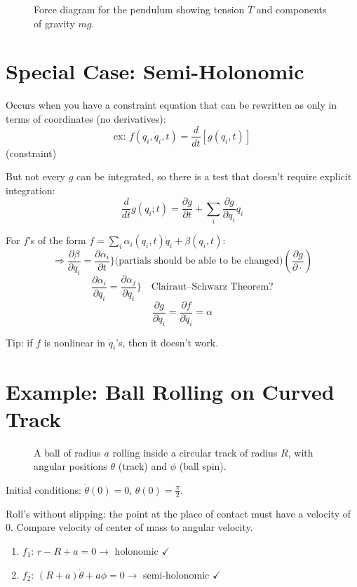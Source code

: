 \begin{figure}[H]
    \centering
    \caption{Force diagram for the pendulum showing tension $T$ and components of gravity $mg$.}
\end{figure}

\section{Special Case: Semi-Holonomic}

Occurs when you have a constraint equation that can be rewritten as only in terms of coordinates (no derivatives):
\[
    \text{ex: } f(q_i, \dot{q}_i, t) = \frac{d}{dt}\!\left[g(q_i, t)\right]
\]
(constraint)

But not every $g$ can be integrated, so there is a test that doesn't require explicit integration:
\[
    \frac{d}{dt}g(q_i; t) = \frac{\partial g}{\partial t} + \sum_i \frac{\partial g}{\partial q_i}\dot{q}_i
\]

For $f$'s of the form $f = \sum_i \alpha_i(q_i, t)\dot{q}_i + \beta(q_i, t)$:
\[
    \Rightarrow \frac{\partial \beta}{\partial q_i} = \frac{\partial \alpha_i}{\partial t} \Bigg\} \text{(partials should be able to be changed)} \left(\frac{\partial g}{\partial \cdot}\right)
\]
\[
    \frac{\partial \alpha_i}{\partial q_i} = \frac{\partial \alpha_j}{\partial q_i} \Bigg\} \quad \text{Clairaut--Schwarz Theorem?}
\]
\[
    \frac{\partial g}{\partial q_i} = \frac{\partial f}{\partial \dot{q}_i} = \alpha
\]

Tip: if $f$ is nonlinear in $\dot{q}_i$'s, then it doesn't work.

\section*{Example: Ball Rolling on Curved Track}

\begin{figure}[H]
    \centering
    \caption{A ball of radius $a$ rolling inside a circular track of radius $R$, with angular positions $\theta$ (track) and $\phi$ (ball spin).}
\end{figure}

Initial conditions: $\dot{\theta}(0) = 0$, $\theta(0) = \tfrac{\pi}{2}$.

Roll's without slipping: the point at the place of contact must have a velocity of 0. Compare velocity of center of mass to angular velocity.

\begin{enumerate}
    \item $f_1$: $r - R + a = 0 \to$ holonomic $\checkmark$
    \item $f_2$: $(R+a)\dot{\theta} + a\dot{\phi} = 0 \to$ semi-holonomic $\checkmark$
\end{enumerate}

